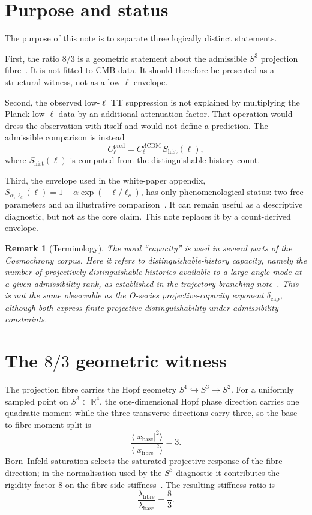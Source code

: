 \documentclass[11pt]{article}
\newtheorem{remark}{Remark}
\newcommand{\Shist}{S_{\mathrm{hist}}}
\newcommand{\lcdm}{\Lambda\mathrm{CDM}}
\begin{document}
\newpage
\section{Purpose and status}
\label{sec:purpose}

The purpose of this note is to separate three logically distinct statements.

First, the ratio $8/3$ is a geometric statement about the admissible $S^3$ projection
fibre~\cite{Cosmochrony}.
It is not fitted to CMB data.
It should therefore be presented as a structural witness, not as a low-$\ell$ envelope.

Second, the observed low-$\ell$ TT suppression is not explained by multiplying the Planck
low-$\ell$ data by an additional attenuation factor.
That operation would dress the observation with itself and would not define a prediction.
The admissible comparison is instead
\[
C_\ell^{\mathrm{pred}}=C_\ell^{\lcdm}\,\Shist(\ell),
\]
where $\Shist(\ell)$ is computed from the distinguishable-history count.

Third, the envelope used in the white-paper appendix,
$S_{\alpha,\ell_c}(\ell)=1-\alpha\exp(-\ell/\ell_c)$, has only phenomenological status: two free
parameters and an illustrative comparison~\cite{Cosmochrony}.
It can remain useful as a descriptive diagnostic, but not as the core claim.
This note replaces it by a count-derived envelope.

\begin{remark}[Terminology]
The word ``capacity'' is used in several parts of the Cosmochrony corpus.
Here it refers to distinguishable-history capacity, namely the number of projectively
distinguishable histories available to a large-angle mode at a given admissibility rank, as
established in the trajectory-branching note~\cite{Beau2026tb}.
This is not the same observable as the O-series projective-capacity exponent
$\delta_{\mathrm{cap}}$, although both express finite projective distinguishability under
admissibility constraints.
\end{remark}

\section{The $8/3$ geometric witness}
\label{sec:witness}

The projection fibre carries the Hopf geometry $S^1\hookrightarrow S^3\rightarrow S^2$.
For a uniformly sampled point on $S^3\subset\mathbb{R}^4$, the one-dimensional Hopf phase direction
carries one quadratic moment while the three transverse directions carry three, so the
base-to-fibre moment split is
\[
\frac{\langle |x_{\mathrm{base}}|^2\rangle}{\langle |x_{\mathrm{fibre}}|^2\rangle}=3 .
\]
Born--Infeld saturation selects the saturated projective response of the fibre direction; in the
normalisation used by the $S^3$ diagnostic it contributes the rigidity factor $8$ on the fibre-side
stiffness~\cite{Cosmochrony}.
The resulting stiffness ratio is
\[
\frac{\lambda_{\mathrm{fibre}}}{\lambda_{\mathrm{base}}}=\frac{8}{3}.
\]
\end{document}
